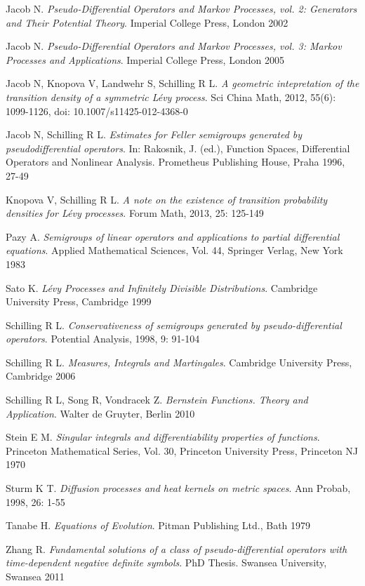 \documentclass[a4paper, 12pt]{report}
\theoremstyle{remark}
\theoremstyle{definition}
\begin{document}
\begin{thebibliography}{99}
 Jacob N.  \emph{Pseudo-Differential Operators and Markov Processes, vol. 2: Generators and Their Potential Theory}.  Imperial College Press, London 2002

 Jacob N.  \emph{Pseudo-Differential Operators and Markov Processes, vol. 3: Markov Processes and Applications}.  Imperial College Press, London 2005

 Jacob N, Knopova V, Landwehr S, Schilling R L.  \emph{A geometric intepretation of the transition density of a symmetric L\'evy process}.  Sci China Math, 2012, 55(6): 1099-1126, doi: 10.1007/s11425-012-4368-0

 Jacob N, Schilling R L.  \emph{Estimates for Feller semigroups generated by pseudodifferential operators}.  In: Rakosnik, J. (ed.), Function Spaces, Differential Operators and Nonlinear Analysis.  Prometheus Publishing House, Praha 1996, 27-49

 Knopova V, Schilling R L.  \emph{A note on the existence of transition probability densities for L\'evy processes}.  Forum Math, 2013, 25: 125-149

 Pazy A.  \emph{Semigroups of linear operators and applications to partial differential equations}.  Applied Mathematical Sciences, Vol. 44, Springer Verlag, New York 1983

 Sato K.  \emph{L\'evy Processes and Infinitely Divisible Distributions}.  Cambridge University Press, Cambridge 1999

 Schilling R L.  \emph{Conservativeness of semigroups generated by pseudo-differential operators}.  Potential Analysis, 1998, 9: 91-104

 Schilling R L.  \emph{Measures, Integrals and Martingales}.  Cambridge University Press, Cambridge 2006

 Schilling R L, Song R, Vondracek Z.  \emph{Bernstein Functions.  Theory and Application}.  Walter de Gruyter, Berlin 2010

 Stein E M.  \emph{Singular integrals and differentiability properties of functions}.  Princeton Mathematical Series, Vol. 30, Princeton University Press, Princeton NJ 1970

 Sturm K T.  \emph{Diffusion processes and heat kernels on metric spaces}.  Ann Probab, 1998, 26: 1-55

 Tanabe H.  \emph{Equations of Evolution}.  Pitman Publishing Ltd., Bath 1979

 Zhang R. \emph{Fundamental solutions of a class of pseudo-differential operators with time-dependent negative definite symbols}.  PhD Thesis. Swansea University, Swansea 2011

\end{thebibliography}
\end{document}
